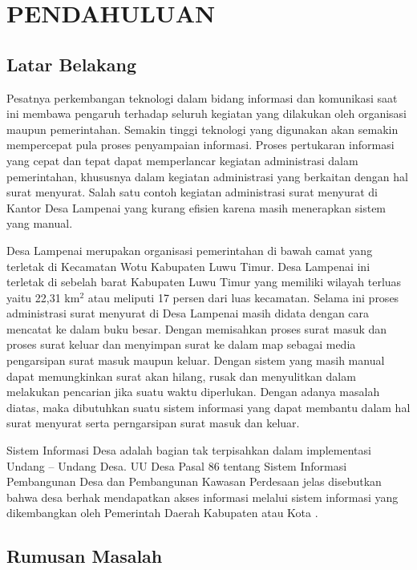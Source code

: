 \chapter{PENDAHULUAN}

\section{Latar Belakang}

Pesatnya perkembangan teknologi dalam bidang informasi dan komunikasi saat ini membawa pengaruh terhadap seluruh kegiatan yang dilakukan oleh organisasi maupun pemerintahan. Semakin tinggi teknologi yang digunakan akan semakin mempercepat pula proses penyampaian informasi. Proses pertukaran informasi yang cepat dan tepat dapat memperlancar kegiatan administrasi dalam pemerintahan, khususnya dalam kegiatan administrasi yang berkaitan dengan hal surat menyurat. Salah satu contoh kegiatan administrasi surat menyurat di Kantor Desa Lampenai yang kurang efisien karena masih menerapkan sistem yang manual.

Desa Lampenai merupakan organisasi pemerintahan di bawah camat yang terletak di Kecamatan Wotu Kabupaten Luwu Timur. Desa Lampenai ini terletak di sebelah barat Kabupaten Luwu Timur yang memiliki wilayah terluas yaitu 22,31 km$^2$ atau meliputi 17 persen dari luas kecamatan. Selama ini proses administrasi surat menyurat di Desa Lampenai masih didata dengan cara mencatat ke dalam buku besar. Dengan memisahkan proses surat masuk dan proses surat keluar dan menyimpan surat ke dalam map sebagai media pengarsipan surat masuk maupun keluar. Dengan sistem yang masih manual dapat memungkinkan surat akan hilang, rusak dan menyulitkan dalam melakukan pencarian jika suatu waktu diperlukan. Dengan adanya masalah diatas, maka dibutuhkan suatu sistem informasi yang dapat membantu dalam hal surat menyurat serta perngarsipan surat masuk dan keluar.

Sistem Informasi Desa adalah bagian tak terpisahkan dalam implementasi Undang – Undang Desa. UU Desa Pasal 86 tentang Sistem Informasi Pembangunan Desa dan Pembangunan Kawasan Perdesaan jelas disebutkan bahwa desa berhak mendapatkan akses informasi melalui sistem informasi yang dikembangkan oleh Pemerintah Daerah Kabupaten atau Kota .

\section{Rumusan Masalah}

